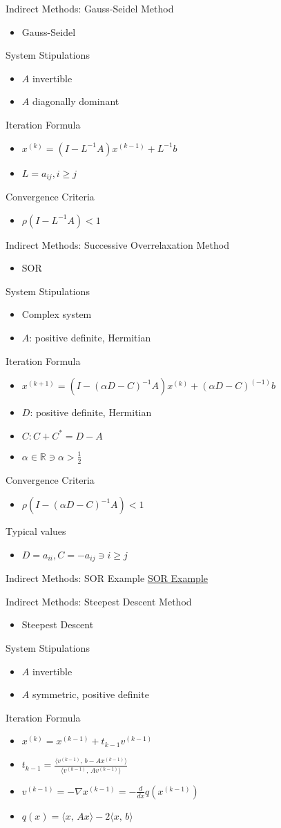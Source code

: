 \documentclass[9pt, serif]{beamer}
\newlength{\wideitemsep}
\let\olditem\item
\renewcommand{\item}{\setlength{\itemsep}{\wideitemsep}\olditem}
\newcommand{\bi}{\begin{itemize}}
\newcommand{\ei}{\end{itemize}}
\begin{document}
\begin{frame}{Indirect Methods: Gauss-Seidel}
    Method
    \bi
        \item Gauss-Seidel
    \ei
    System Stipulations
    \bi
        \item $A$ invertible
        \item $A$ diagonally dominant
    \ei
    Iteration Formula
    \bi
        \item $x^{(k)} = (I-L^{-1}A)x^{(k-1)}+L^{-1}b$
        \item $L = a_{ij}, i \ge j$ 
    \ei
    Convergence Criteria
    \bi
        \item $\rho(I-L^{-1}A)<1$
    \ei
\end{frame}


\begin{frame}{Indirect Methods: Successive Overrelaxation}
    Method
    \bi
        \item SOR
    \ei
    System Stipulations
    \bi
        \item Complex system
        \item $A$: positive definite, Hermitian
    \ei
    Iteration Formula
    \bi
        \item $x^{(k+1)}=(I-(\alpha D-C)^{-1}A)x^{(k)}+(\alpha D-C)^{(-1)}b$
        \item $D$: positive definite, Hermitian
        \item $C: C+C^*=D-A$
        \item $\alpha\in\mathbb{R} \ni \alpha>\frac{1}{2}$
    \ei
    Convergence Criteria
    \bi
        \item $\rho(I-(\alpha D-C)^{-1}A)<1$
    \ei
    Typical values
    \bi
        \item $D = a_{ii}, C = -a_{ij} \ni i \ge j$
    \ei
\end{frame}


\begin{frame}{Indirect Methods: SOR Example}
    \href{http://www.youtube.com/watch?v=Mnrxljo1lOM}{SOR Example}
\end{frame}


\begin{frame}{Indirect Methods: Steepest Descent}
    Method
    \bi
        \item Steepest Descent
    \ei
    System Stipulations
    \bi
        \item $A$ invertible
        \item $A$ symmetric, positive definite
    \ei
    Iteration Formula
    \bi
        \item $x^{(k)} = x^{(k-1)}+t_{k-1}v^{(k-1)}$
        \item $t_{k-1} = \frac{\langle v^{(k-1)},\, b - Ax^{(k-1)}\rangle}{\langle v^{(k-1)},\, Av^{(k-1)} \rangle}$
        \item $v^{(k-1)} = -\nabla x^{(k-1)} = -\frac{d}{dx} q(x^{(k-1)})$
        \item $q(x) = \langle x,\, Ax \rangle - 2 \langle x,\, b \rangle$
    \ei
\end{frame}
\end{document}

